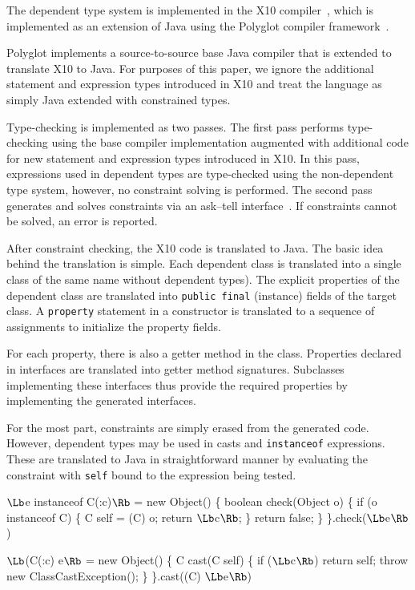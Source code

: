%

The dependent type system is implemented in the X10
compiler~\cite{X10}, which is implemented as an extension of
Java using the Polyglot compiler framework~\cite{ncm03}.

Polyglot implements a source-to-source base Java compiler 
that is extended to translate X10 to Java.  For purposes of this
paper, we ignore the additional statement and expression types
introduced in X10 and treat the language as simply Java
extended with constrained types.

Type-checking is implemented as two passes.  The first pass
performs type-checking using the base compiler implementation
augmented with additional code for new statement and expression
types introduced in X10. In this pass, expressions used in
dependent types are type-checked using the non-dependent type
system, however, no constraint solving is performed.
The second pass generates and solves constraints via an
ask--tell interface~\cite{my-thesis-book}.
If constraints cannot be solved, an error is reported.

After constraint checking, the X10 code is translated to Java.
The basic idea behind the translation is simple. Each dependent class
is translated into a single class of the same name without dependent
types). The explicit properties of the dependent class are translated
into {\tt public final} (instance) fields of the target class.
A {\tt property} statement in a constructor is translated to a
sequence of assignments to initialize the property fields.

For each property, there is also a getter method in the class.
Properties declared in interfaces are translated into getter
method signatures.  Subclasses implementing these interfaces
thus provide the required properties by implementing the
generated interfaces.

For the most part, constraints are simply erased from the
generated code.
However, dependent types may be used in casts
and {\tt instanceof} expressions.  These are translated to Java
in straightforward manner by evaluating the constraint with
{\tt self} bound to the expression being tested.

\begin{code}
  $\Lb$e instanceof C(:c)$\Rb$ = 
    new Object() \{
      boolean check(Object o) \{
        if (o instanceof C) \{
          C self = (C) o;
          return $\Lb$c$\Rb$;
        \}
        return false;
      \}
    \}.check($\Lb$e$\Rb$)
\end{code}

\begin{code}
  $\Lb$(C(:c) e$\Rb$ = 
    new Object() \{
      C cast(C self) \{
        if ($\Lb$c$\Rb$)
          return self;
        throw new ClassCastException();
      \}
    \}.cast((C) $\Lb$e$\Rb$)
\end{code}


